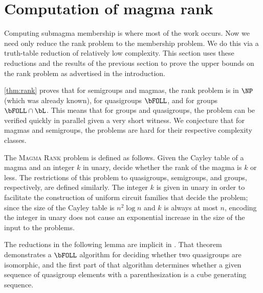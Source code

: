 \section{Computation of magma rank}\label{sec:rank}

%
Computing submagma membership is where most of the work occurs.
Now we need only reduce the rank problem to the membership problem.
We do this via a truth-table reduction of relatively low complexity.
This section uses these reductions and the results of the previous section to prove the upper bounds on the rank problem as advertised in the introduction.

%
\autoref{thm:rank} proves that for semigroups and magmas, the rank problem is in $\NP$ (which was already known), for quasigroups $\bFOLL$, and for groups $\bFOLL \cap \bL$.
This means that for groups and quasigroups, the problem can be verified quickly in parallel given a very short witness.
We conjecture that for magmas and semigroups, the problems are hard for their respective complexity classes.

The \textsc{Magma Rank} problem is defined as follows.
Given the Cayley table of a magma and an integer $k$ in unary, decide whether the rank of the magma is $k$ or less.
The restrictions of this problem to quasigroups, semigroups, and groups, respectively, are defined similarly.
The integer $k$ is given in unary in order to facilitate the construction of uniform circuit families that decide the problem; since the size of the Cayley table is $n^2 \log n$ and $k$ is always at most $n$, encoding the integer in unary does not cause an exponential increase in the size of the input to the problems.

The reductions in the following lemma are implicit in \autocite[Theorem~3.4]{ctw13}.
That theorem demonstrates a $\bFOLL$ algorithm for deciding whether two quasigroups are isomorphic, and the first part of that algorithm determines whether a given sequence of quasigroup elements with a parenthesization is a cube generating sequence.

